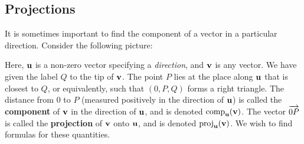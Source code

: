 \subsection{Projections}\label{ssec:projections}

It is sometimes important to find the component of a vector in a
particular direction. Consider the following picture:
\begin{center}
\end{center}
Here, $\vect{u}$ is a non-zero vector specifying a {\em direction},
and $\vect{v}$ is any vector. We have given the label $Q$ to the tip
of $\vect{v}$. The point $P$ lies at the place along $\vect{u}$ that
is closest to $Q$, or equivalently, such that $(0,P,Q)$ forms a right
triangle. The distance from $0$ to $P$ (measured positively in the
direction of $\vect{u}$) is called the \textbf{component}%
%
 of $\vect{v}$ in the direction of $\vect{u}$,
and is denoted $\comp_{\vect{u}}(\vect{v})$. The vector
$\overrightarrow{0P}$ is called the \textbf{projection}%
%
 of $\vect{v}$ onto $\vect{u}$, and is
denoted $\proj_{\vect{u}}(\vect{v})$. We wish to find formulas for
these quantities.


